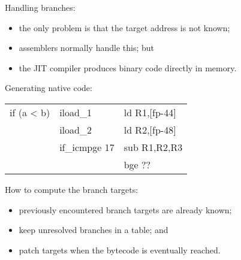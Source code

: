 \begin{slide*}
Handling branches:
\begin{itemize}
\item the only problem is that the target
  address is not known;
\item assemblers normally handle this; but
\item the JIT compiler produces binary code directly in memory.
\end{itemize}
\renewcommand{\arraystretch}{0.9}

Generating native code:
\begin{center}
\begin{scriptsize}
\begin{tt}
\begin{tabular}{l@{~~~}l@{~~~}l}
if (a < b)     &        iload\_1        &   ld R1,[fp-44] \\
               &        iload\_2        &   ld R2,[fp-48] \\
               &        if\_icmpge 17   &   sub R1,R2,R3        \\
               &                       &   bge ??
\end{tabular}
\end{tt}
\end{scriptsize}
\end{center}
How to compute the branch targets:
\begin{itemize}
\item previously encountered branch targets are already known;
\item keep unresolved branches in a table; and
\item patch targets when the bytecode is eventually reached.
\end{itemize}
\renewcommand{\arraystretch}{1}
\vfil
\end{slide*}



